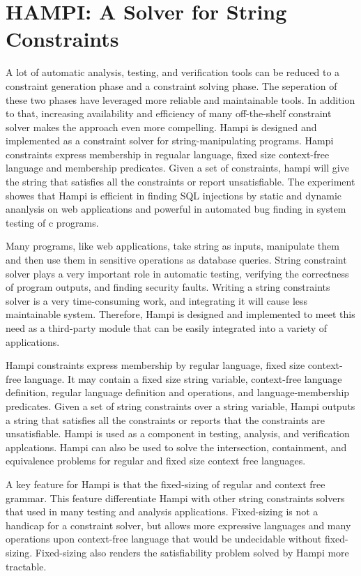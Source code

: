\section{HAMPI: A Solver for String Constraints}
A lot of automatic analysis, testing, and verification tools can be reduced to a constraint generation phase and a constraint solving phase. The seperation of these two phases have leveraged more reliable and maintainable tools. In addition to that, increasing availability and efficiency of many off-the-shelf constraint solver makes the approach even more compelling. Hampi \cite{hampi} is designed and implemented as a constraint solver for string-manipulating programs. Hampi constraints express membership in regualar language, fixed size context-free language and membership predicates. Given a set of constraints, hampi will give the string that satisfies all the constraints or report unsatisfiable. The experiment showes that Hampi is efficient in finding SQL injections by static and dynamic ananlysis on web applications and powerful in automated bug finding in system testing of c programs.
 
Many programs, like web applications, take string as inputs, manipulate them and then use them in sensitive operations as database queries. String constraint solver plays a very important role in automatic testing\cite{}, verifying the correctness of program outputs\cite{}, and finding security faults\cite{}. Writing a string constraints solver is a very time-consuming work, and integrating it will cause less maintainable system. Therefore, Hampi is designed and implemented to meet this need as a third-party module that can be easily integrated into a variety of applications.     

Hampi constraints express membership by regular language, fixed size context-free language. It may contain a fixed size string variable, context-free language definition, regular language definition and operations, and language-membership predicates. Given a set of string constraints over a string variable, Hampi outputs a string that satisfies all the constraints or reports that the constraints are unsatisfiable. Hampi is used as a component in testing, analysis, and verification applcations. Hampi can also be used to solve the intersection, containment, and equivalence problems for regular and fixed size context free languages.

A key feature for Hampi is that the fixed-sizing of regular and context free grammar. This feature differentiate Hampi with other string constraints solvers that used in many testing and analysis applications. Fixed-sizing is not a handicap for a constraint solver, but allows more expressive languages and many operations upon context-free language that would be undecidable without fixed-sizing. Fixed-sizing also renders the satisfiability problem solved by Hampi more tractable.

